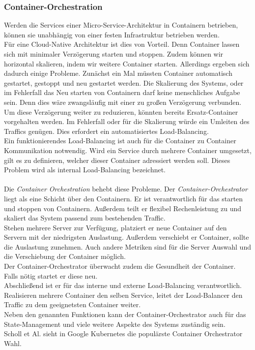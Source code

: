 \subsubsection{Container-Orchestration}
Werden die Services einer Micro-Service-Architektur in Containern betrieben, können sie unabhängig von einer festen Infrastruktur betrieben werden.\\
Für eine Cloud-Native Architektur ist dies von Vorteil. Denn Container lassen sich mit minimaler Verzögerung starten und stoppen. Zudem können wir horizontal skalieren, indem wir weitere Container starten. Allerdings ergeben sich dadurch einige Probleme. Zunächst ein Mal müssten Container automatisch gestartet, gestoppt und neu gestartet werden. Die Skalierung des Systems, oder im Fehlerfall das Neu starten von Containern darf keine menschliches Aufgabe sein. Denn dies wäre zwangsläufig mit einer zu großen Verzögerung verbunden.\\
Um diese Verzögerung weiter zu reduzieren, könnten bereits Ersatz-Container vorgehalten werden. Im Fehlerfall oder für die Skalierung würde ein Umleiten des Traffics genügen. Dies erfordert ein automatisiertes Load-Balancing.\\
Ein funktionierendes Load-Balancing ist auch für die Container zu Container Kommunikation notwendig. Wird ein Service durch mehrere Container umgesetzt, gilt es zu definieren, welcher dieser Container adressiert werden soll. Dieses Problem wird als internal Load-Balancing bezeichnet. \\\\

Die\textit{ Container Orchestration}\cite{scholl_cloud_2019} behebt diese Probleme. Der \textit{Container-Orchestrator} liegt als eine Schicht über den Containern. Er ist verantwortlich für das starten und stoppen von Containern. Außerdem teilt er flexibel Rechenleistung zu und skaliert das System passend zum bestehenden Traffic.\\
Stehen mehrere Server zur Verfügung, platziert er neue Container auf den Servern mit der niedrigsten Auslastung. Außerdem verschiebt er Container, sollte die Auslastung zunehmen. Auch andere Metriken sind für die Server Auswahl und die Verschiebung der Container möglich.\\
Der Container-Orchestrator überwacht zudem die Gesundheit der Container. Falls nötig startet er diese neu.\\
Abschließend ist er für das interne und externe Load-Balancing verantwortlich. Realisieren mehrere Container den selben Service, leitet der Load-Balancer den Traffic zu dem geeignetsten Container weiter. \\
Neben den genannten Funktionen kann der Container-Orchestrator auch für das State-Management und viele weitere Aspekte des Systems zuständig sein.\\
Scholl et Al.\cite{scholl_cloud_2019} sieht in Google Kubernetes \cite{kubernetes_production-grade_nodate} die populärste Container Orchestrator Wahl.
